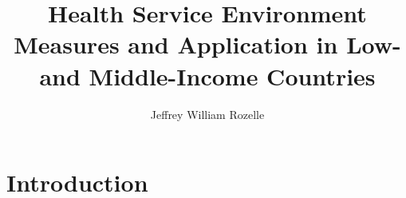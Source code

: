 \documentclass[11pt]{report}
\begin{document}
\title{Health Service Environment Measures and Application in Low- and Middle-Income Countries}

\author{Jeffrey William Rozelle}




\begin{preface}



  {
  \tableofcontents
  \listoftables
  \listoffigures
  }

  
  
\end{preface}

\chapter{Introduction} 
\label{ch:introduction}

\graphicspath{}



%
%
%
%
%   
%   
%
%
%
%
%
%
%
%
\end{document}
